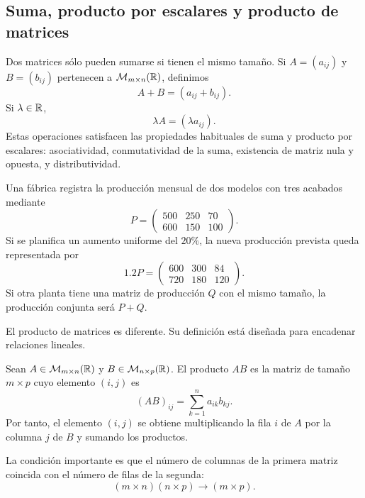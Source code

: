 \subsection{Suma, producto por escalares y producto de matrices}

Dos matrices sólo pueden sumarse si tienen el mismo tamaño. Si $A=(a_{ij})$ y $B=(b_{ij})$ pertenecen a $\mathcal M_{m\times n}(\mathbb{R})$, definimos
\[
A+B=(a_{ij}+b_{ij}).
\]
Si $\lambda\in\mathbb{R}$,
\[
\lambda A=(\lambda a_{ij}).
\]
Estas operaciones satisfacen las propiedades habituales de suma y producto por escalares: asociatividad, conmutatividad de la suma, existencia de matriz nula y opuesta, y distributividad.

\begin{example}
Una fábrica registra la producción mensual de dos modelos con tres acabados mediante
\[
P=
\begin{pmatrix}
500&250&70\\
600&150&100
\end{pmatrix}.
\]
Si se planifica un aumento uniforme del $20\%$, la nueva producción prevista queda representada por
\[
1.2P=
\begin{pmatrix}
600&300&84\\
720&180&120
\end{pmatrix}.
\]
Si otra planta tiene una matriz de producción $Q$ con el mismo tamaño, la producción conjunta será $P+Q$.
\end{example}

El producto de matrices es diferente. Su definición está diseñada para encadenar relaciones lineales.

\begin{definition}
Sean $A\in\mathcal M_{m\times n}(\mathbb{R})$ y $B\in\mathcal M_{n\times p}(\mathbb{R})$. El producto $AB$ es la matriz de tamaño $m\times p$ cuyo elemento $(i,j)$ es
\[
(AB)_{ij}=\sum_{k=1}^{n}a_{ik}b_{kj}.
\]
Por tanto, el elemento $(i,j)$ se obtiene multiplicando la fila $i$ de $A$ por la columna $j$ de $B$ y sumando los productos.
\end{definition}

La condición importante es que el número de columnas de la primera matriz coincida con el número de filas de la segunda:
\[
(m\times n)(n\times p)\longrightarrow(m\times p).
\]

